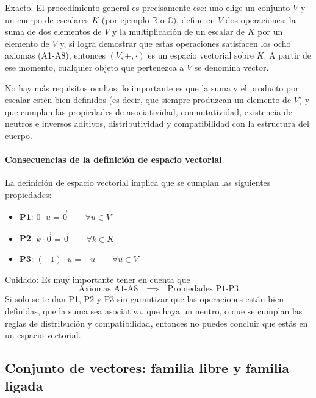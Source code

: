 \begin{tcolorbox}[interesting_data, title=¿Puedo crear un conjunto cualquiera y verificar si es un espacio vectorial?]
  Exacto. El procedimiento general es precisamente ese: uno elige un conjunto \(V\) y un cuerpo de escalares \(K\) (por ejemplo \(\mathbb{R}\) o \(\mathbb{C}\)), define en \(V\) dos operaciones: la suma de dos elementos de \(V\) y la multiplicación de un escalar de \(K\) por un elemento de \(V\) y, si logra demostrar que estas operaciones satisfacen los ocho axiomas (A1-A8), entonces \((V,+,\cdot)\) es un espacio vectorial sobre \(K\). A partir de ese momento, cualquier objeto que pertenezca a \(V\) se denomina vector.

  No hay más requisitos ocultos: lo importante es que la suma y el producto por escalar estén bien definidos (es decir, que siempre produzcan un elemento de \(V\)) y que cumplan las propiedades de asociatividad, conmutatividad, existencia de neutros e inversos aditivos, distributividad y compatibilidad con la estructura del cuerpo.
\end{tcolorbox}

\paragraph{Consecuencias de la definición de espacio vectorial}

La definición de espacio vectorial implica que se cumplan las siguientes propiedades:
\begin{itemize}
  \item \textbf{P1}: \(0\cdot u = \vec{0} \qquad \forall u \in V\)
  \item \textbf{P2}: \(k \cdot \vec{0} = \vec{0} \qquad \forall k \in K\)
  \item \textbf{P3}: \((-1) \cdot u = -u \qquad \forall u \in V\)
\end{itemize}

\begin{tcolorbox}[mydanger]
  Cuidado: Es muy importante tener en cuenta que \[
  \text{Axiomas A1-A8} \quad \implies \quad \text{Propiedades P1-P3}
  \]
  Si solo se te dan P1, P2 y P3 sin garantizar que las operaciones están bien definidas, que la suma sea asociativa, que haya un neutro, o que se cumplan las reglas de distribución y compatibilidad, entonces no puedes concluir que estás en un espacio vectorial.
\end{tcolorbox}

\subsection{Conjunto de vectores: familia libre y familia ligada}

